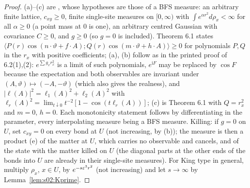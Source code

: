\begin{proof}
(a)--(c) are \cite[Thms.~6.1, 6.2(1),(2)]{BFS1}, whose hypotheses are those of a BFS measure: an arbitrary finite lattice, $c_{xy}\ge0$, finite single-site measures on $[0,\infty)$ with $\int e^{\alpha r^2}d\rho_x<\infty$ for all $\alpha\ge0$ (a point mass at $0$ is one), an arbitrary centred Gaussian with covariance $C\ge0$, and $g\ge0$ (so $g=0$ is included). Theorem 6.1 states $\langle P(r)\cos(n\cdot\vartheta+f\cdot A);Q(r)\cos(m\cdot\vartheta+h\cdot A)\rangle\ge0$ for polynomials $P,Q$ in the $r_x$ with positive coefficients; (a), (b) follow as in the printed proof of 6.2(1),(2): $e^{\sum g_xr_x^2}$ is a limit of such polynomials, $e^{\mathrm iF}$ may be replaced by $\cos F$ because the expectation and both observables are invariant under $(A,\vartheta)\mapsto(-A,-\vartheta)$ (which also gives the realness), and $|\ell(A)|^2=\ell_1(A)^2+\ell_2(A)^2$ with $\ell_r(A)^2=\lim_{t\downarrow0}t^{-2}[1-\cos(t\ell_r(A))]$; (c) is Theorem 6.1 with $Q=r_x^2$ and $m=0$, $h=0$. Each monotonicity statement follows by differentiating in the parameter, every interpolating measure being a BFS measure. Killing: if $g=0$ on $U$, set $c_{xy}=0$ on every bond at $U$ (not increasing, by (b)); the measure is then a product (e) of the matter at $U$, which carries no observable and cancels, and of the state with the matter killed on $U$ (the diagonal parts at the other ends of the bonds into $U$ are already in their single-site measures). For King type in general, multiply $\rho_x$, $x\in U$, by $e^{-s\varepsilon^3r^2}$ (not increasing) and let $s\to\infty$ by Lemma~\ref{lem:s02:Kprime}.


\end{proof}
